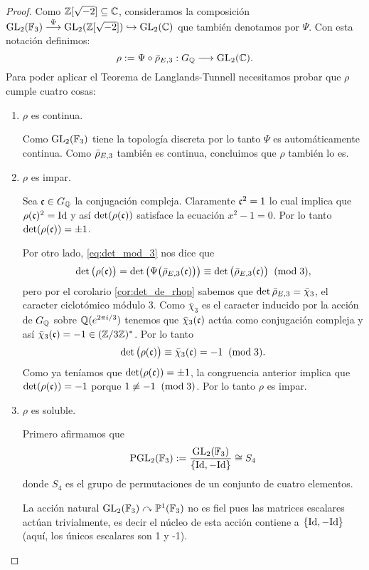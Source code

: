 \documentclass[../../tesis_maestria]{subfiles}
\begin{document}
\begin{proof}
Como $\mathbb{Z}[\sqrt{-2}]\subseteq\mathbb{C}$, consideramos la composici\'on $\mathrm{GL}_2(\mathbb{F}_3)\overset{\Psi}{\longrightarrow}\mathrm{GL}_2(\mathbb{Z}[\sqrt{-2}])\hookrightarrow\mathrm{GL}_2(\mathbb{C})$ que tambi\'en denotamos por $\Psi$. Con esta notaci\'on definimos:
  \[
    \rho:=\Psi\circ\bar{\rho}_{E,3}:G_{\mathbb{Q}}\longrightarrow\mathrm{GL}_2(\mathbb{C}).
  \]
  Para poder aplicar el Teorema de Langlands-Tunnell necesitamos probar que $\rho$ cumple cuatro cosas:
  \begin{enumerate}[label=\emph{\roman*})]
  \item $\rho$ es continua.

    \-\;\; Como $\mathrm{GL}_2(\mathbb{F}_3)$ tiene la topolog\'ia discreta por lo tanto $\Psi$ es autom\'aticamente continua. Como $\bar{\rho}_{E,3}$ tambi\'en es continua, concluimos que $\rho$ tambi\'en lo es.
  \item\label{inciso_sigma_impar} $\rho$ es impar.

    \-\;\; Sea $\mathfrak{c}\in G_{\mathbb{Q}}$ la conjugaci\'on compleja. Claramente $\mathfrak{c}^2=1$ lo cual implica que $\rho(\mathfrak{c})^2=\mathrm{Id}$ y as\'i $\det(\rho(\mathfrak{c}))$ satisface la ecuaci\'on $x^2-1=0$. Por lo tanto $\det(\rho(\mathfrak{c}))=\pm1$.

    \-\;\; Por otro lado, \eqref{eq:det_mod_3} nos dice que
    \[
      \det\big(\rho(\mathfrak{c})\big) = \det\big(\Psi\big(\bar{\rho}_{E,3}(\mathfrak{c})\big)\big) \equiv
      \det\big(\bar{\rho}_{E,3}(\mathfrak{c})\big) \;\;(\mathrm{mod}\; 3),
    \]
    pero por el corolario \ref{cor:det_de_rhop} sabemos que $\det\bar{\rho}_{E,3}=\bar{\chi}_3$, el caracter ciclot\'omico m\'odulo 3. Como $\bar{\chi}_3$ es el caracter inducido por la acci\'on de $G_{\mathbb{Q}}$ sobre $\mathbb{Q}(e^{2\pi i/3})$ tenemos que $\bar{\chi}_3(\mathfrak{c})$ act\'ua como conjugaci\'on compleja y as\'i $\bar{\chi}_3(\mathfrak{c})=-1\in(\mathbb{Z}/3\mathbb{Z})^*$. Por lo tanto
    \[
      \det\big(\rho(\mathfrak{c})\big) \equiv \bar{\chi}_3(\mathfrak{c})= -1 \;\;(\mathrm{mod}\; 3).
    \]
    Como ya ten\'iamos que $\det(\rho(\mathfrak{c}))=\pm 1$, la congruencia anterior implica que $\det(\rho(\mathfrak{c}))=-1$ porque $1\not\equiv -1\;\;(\mathrm{mod}\; 3)$. Por lo tanto $\rho$ es impar.
  \item $\rho$ es soluble.
    
    \-\;\; Primero afirmamos que
    \begin{equation}\label{eq:pgl23_S4}
      \mathrm{PGL}_2(\mathbb{F}_3):=\frac{\mathrm{GL}_2(\mathbb{F}_3)}{\{\mathrm{Id},-\mathrm{Id}\}}\cong S_4
    \end{equation}
    donde $S_4$ es el grupo de permutaciones de un conjunto de cuatro elementos.

    \-\;\; La acción natural $\mathrm{GL}_2(\mathbb{F}_3)\curvearrowright\mathbb{P}^1(\mathbb{F}_3)$ no es fiel pues las matrices escalares actúan trivialmente, es decir el núcleo de esta acción contiene a $\{\mathrm{Id},-\mathrm{Id}\}$ (aquí, los únicos escalares son 1 y -1).
    

\end{enumerate}
\end{proof}
\end{document}
